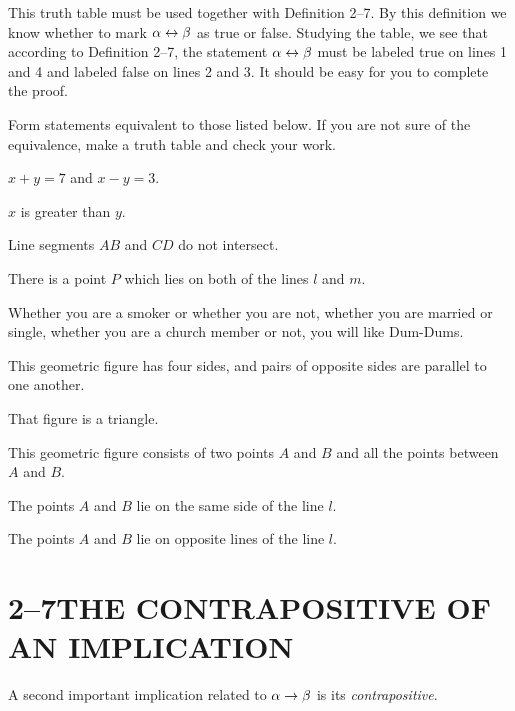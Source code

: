 \documentclass[11pt]{book}
\begin{document}
This truth table must be used together with Definition 2--7. By this definition we
know whether to mark $\alpha \leftrightarrow \beta$ as true or false. Studying the table, we see
that according to Definition 2--7, the statement $\alpha \leftrightarrow \beta$ must be labeled
true on lines 1 and 4 and labeled false on lines 2 and 3. It should be easy for
you to complete the proof.


Form statements equivalent to those listed below. If you are not sure of the
equivalence, make a truth table and check your work.

\begin{exercisecols}
\begin{exlist}
\item $x + y = 7$ and $x - y = 3$.
\item $x$ is greater than $y$.
\item Line segments $AB$ and $CD$ do not intersect.
\item There is a point $P$ which lies on both of the lines $l$ and $m$.
\item Whether you are a smoker or whether you are not, whether you are married or
      single, whether you are a church member or not, you will like Dum-Dums.
\item This geometric figure has four sides, and pairs of opposite sides are
      parallel to one another.
\item That figure is a triangle.
\item This geometric figure consists of two points $A$ and $B$ and all the points
      between $A$ and $B$.
\item The points $A$ and $B$ lie on the same side of the line $l$.
\item The points $A$ and $B$ lie on opposite lines of the line $l$.
\end{exlist}
\end{exercisecols}

\section*{2--7\quad THE CONTRAPOSITIVE OF AN IMPLICATION}

A second important implication related to $\alpha \rightarrow \beta$ is its
\emph{contrapositive}.
\end{document}
